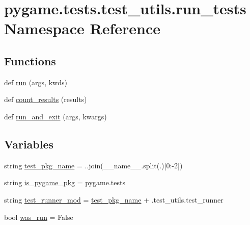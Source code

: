 \hypertarget{namespacepygame_1_1tests_1_1test__utils_1_1run__tests}{}\section{pygame.\+tests.\+test\+\_\+utils.\+run\+\_\+tests Namespace Reference}
\label{namespacepygame_1_1tests_1_1test__utils_1_1run__tests}
\subsection*{Functions}
\begin{DoxyCompactItemize}
\item 
def \hyperlink{namespacepygame_1_1tests_1_1test__utils_1_1run__tests_abd44671ba82757dadf8dbff244827152}{run} (args, kwds)
\item 
def \hyperlink{namespacepygame_1_1tests_1_1test__utils_1_1run__tests_a9aa509d33962241ddce9ea8c23f3dd44}{count\+\_\+results} (results)
\item 
def \hyperlink{namespacepygame_1_1tests_1_1test__utils_1_1run__tests_a0980c4b32a67289915e83ef70b7e71ae}{run\+\_\+and\+\_\+exit} (args, kwargs)
\end{DoxyCompactItemize}
\subsection*{Variables}
\begin{DoxyCompactItemize}
\item 
string \hyperlink{namespacepygame_1_1tests_1_1test__utils_1_1run__tests_a893dd76028e6020f32d315cc79160c8b}{test\+\_\+pkg\+\_\+name} = \textquotesingle{}.\textquotesingle{}.join(\+\_\+\+\_\+name\+\_\+\+\_\+.\+split(\textquotesingle{}.\textquotesingle{})\mbox{[}0\+:-\/2\mbox{]})
\item 
string \hyperlink{namespacepygame_1_1tests_1_1test__utils_1_1run__tests_a81161e08464695fe2e6c042dda62f430}{is\+\_\+pygame\+\_\+pkg} = \textquotesingle{}pygame.\+tests\textquotesingle{}
\item 
string \hyperlink{namespacepygame_1_1tests_1_1test__utils_1_1run__tests_a551430c93ecaad1329ef68418a2b39bc}{test\+\_\+runner\+\_\+mod} = \hyperlink{namespacepygame_1_1tests_1_1test__utils_1_1run__tests_a893dd76028e6020f32d315cc79160c8b}{test\+\_\+pkg\+\_\+name} + \textquotesingle{}.test\+\_\+utils.\+test\+\_\+runner\textquotesingle{}
\item 
bool \hyperlink{namespacepygame_1_1tests_1_1test__utils_1_1run__tests_a7f32535107c97efd7704268f582f4e2d}{was\+\_\+run} = False
\end{DoxyCompactItemize}


